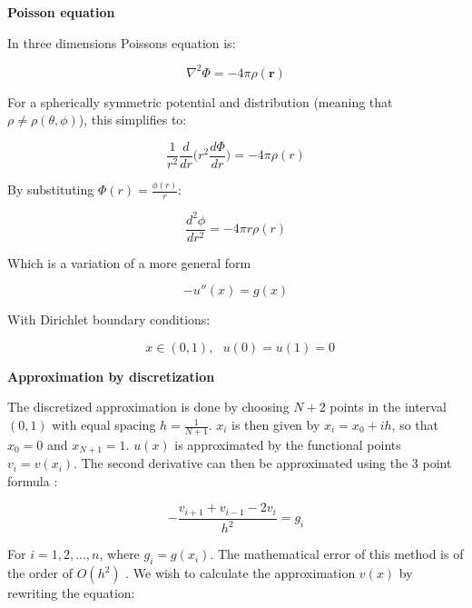 \documentclass[11pt]{article}
\begin{document}
\begin{flushleft}

\textbf{Poisson equation}

In three dimensions Poissons equation is:

\begin{equation}
\nabla^2 \Phi = -4 \pi \rho (\textbf{r})
\end{equation}

For a spherically symmetric potential and distribution (meaning that $\rho \neq \rho( \theta, \phi)$), this simplifies to:

\begin{equation*}
\frac{1}{r^2} \frac{d}{dr} \Big( r^2 \frac{d \Phi}{dr} \Big) = -4 \pi \rho (r)
\end{equation*}

By substituting $\Phi (r) = \frac{\phi(r)}{r}$:

\begin{equation*}
\frac{d^2 \phi}{dr^2} = -4 \pi r \rho (r)
\end{equation*}

Which is a variation of a more general form

\begin{equation}
-u''(x) = g(x)
\end{equation}

With Dirichlet boundary conditions:

\begin{equation*}
\textbf{ } x \in (0,1), \textbf{ } u(0) = u(1) = 0
\end{equation*}

\textbf{Approximation by discretization}

The discretized approximation is done by choosing $N+2$ points in the interval $(0,1)$ with equal spacing $h = \frac{1}{N+1}$. $x_i$ is then given by $x_i = x_0 + ih$, so that $x_0 = 0$ and $x_{N+1} = 1$. $u(x)$ is approximated by the functional points $v_i = v(x_i)$. The second derivative can then be approximated using the 3 point formula \cite{morken2013numerical}:

\begin{equation}
- \frac{v_{i+1} + v_{i-1} - 2 v_i}{h^2} = g_i 
\end{equation}

For $i = 1,2,...,n$, where $g_i = g(x_i)$. The mathematical error of this method is of the order of $O(h^2)$ \cite{morken2013numerical}. We wish to calculate the approximation $v(x)$ by rewriting the equation:


\end{flushleft}
\end{document}
